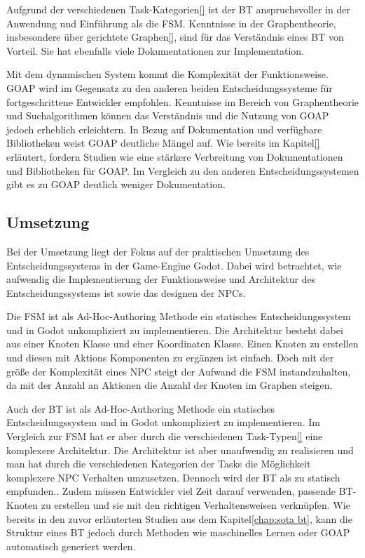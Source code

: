 Aufgrund der verschiedenen Task-Kategorien\ref{} ist der BT anspruchsvoller in der Anwendung und Einf\"{u}hrung als die FSM. Kenntnisse in der Graphentheorie, insbesondere \"{u}ber gerichtete Graphen\ref{}, sind f\"{u}r das Verst\"{a}ndnis eines BT von Vorteil. Sie hat ebenfalls viele Dokumentationen zur Implementation.

Mit dem dynamischen System kommt die Komplexit\"{a}t der Funktionsweise. GOAP wird im Gegensatz zu den anderen beiden Entscheidungssysteme f\"{u}r fortgeschrittene Entwickler empfohlen. Kenntnisse im Bereich von Graphentheorie und Suchalgorithmen k\"{o}nnen das Verst\"{a}ndnis und die Nutzung von GOAP jedoch erheblich erleichtern. In Bezug auf Dokumentation und verf\"{u}gbare Bibliotheken weist GOAP deutliche M\"{a}ngel auf. Wie bereits im Kapitel\ref{} erl\"{a}utert, fordern Studien wie \autocite{sielicki2018adaptation} eine st\"{a}rkere Verbreitung von Dokumentationen und Bibliotheken f\"{u}r GOAP. Im Vergleich zu den anderen Entscheidungssystemen gibt es zu GOAP deutlich weniger Dokumentation.


\subsection{Umsetzung}
\label{chap:umsetzung}

Bei der Umsetzung liegt der Fokus auf der praktischen Umsetzung des Entscheidungssystems in der Game-Engine Godot. Dabei wird betrachtet, wie aufwendig die Implementierung der Funktionsweise und Architektur des Entscheidungssystems ist sowie das designen der NPCs.

Die FSM ist als Ad-Hoc-Authoring Methode ein statisches Entscheidungssystem und in Godot unkompliziert zu implementieren. Die Architektur besteht dabei aus einer Knoten Klasse und einer Koordinaten Klasse. Einen Knoten zu erstellen und diesen mit Aktions Komponenten zu erg\"{a}nzen ist einfach. Doch mit der gr\"{o}\ss{}e der Komplexit\"{a}t eines NPC steigt der Aufwand die FSM instandzuhalten, da mit der Anzahl an Aktionen die Anzahl der Knoten im Graphen steigen.

Auch der BT ist als Ad-Hoc-Authoring Methode ein statisches Entscheidungssystem und in Godot unkompliziert zu implementieren. Im Vergleich zur FSM hat er aber durch die verschiedenen Task-Typen\ref{} eine komplexere Architektur. Die Architektur ist aber unaufwendig zu realisieren und man hat durch die verschiedenen Kategorien der Tasks die M\"{o}glichkeit komplexere NPC Verhalten umzusetzen. Dennoch wird der BT als zu statisch empfunden.\autocite{aiag}. Zudem m\"{u}ssen Entwickler viel Zeit darauf verwenden, passende BT-Knoten zu erstellen und sie mit den richtigen Verhaltensweisen verkn\"{u}pfen.\autocite{Schwab2021} Wie bereits in den zuvor erl\"{a}uterten Studien aus dem Kapitel\ref{chap:sota bt}, kann die Struktur eines BT jedoch durch Methoden wie maschinelles Lernen oder GOAP automatisch generiert werden.

